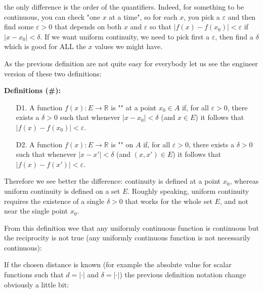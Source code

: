 	the only difference is the order of the quantifiers. Indeed, for something to be continuous, you can check "one $x$ at a time", so for each $x$, you pick a $\varepsilon$ and then find some $\varepsilon>0$ that depends on both $x$ and $\varepsilon$ so that $|f(x)-f(x_0)|<\varepsilon$ if $|x-x_0|<\delta$. If we want uniform continuity, we need to pick first a $\varepsilon$, then find a $\delta$ which is good for ALL the $x$ values we might have.
	
	As the previous definition are not quite easy for everybody let us see the engineer version of these two definitions:
	
	\pagebreak
	\textbf{Definitions (\#\mydef):}
	\begin{enumerate}
		\item[D1.] A function $f(x):E \rightarrow \mathbb{R}$ is "" at a point $x_0\in A$ if, for all $\varepsilon>0$, there exists a $\delta>0$ such that whenever $|x-x_0|<\delta$ (and $x\in E$) it follows that $|f(x)-f(x_0)|<\varepsilon$.
		
		\item[D2.] A function $f(x):E \rightarrow \mathbb{R}$ is "" on $A$ if, for all $\varepsilon>0$, there exists a $\delta>0$ such that whenever $|x-x'|<\delta$ (and $(x,x')\in E$) it follows that $|f(x)-f(x')|<\varepsilon$.
	\end{enumerate}
	Therefore we see better the difference: continuity is defined at a point $x_0$, whereas uniform continuity is defined on a set $E$. Roughly speaking, uniform continuity requires the existence of a single $\delta>0$ that works for the whole set $E$, and not near the single point $x_0$.
	
	From this definition wee that any uniformly continuous function is continuous but the reciprocity is not true (any uniformly continuous function is not necessarily continuous):
	
	If the chosen distance is known (for example the absolute value for scalar functions such that $d=|\cdot|$ and $\delta=|\cdot|$) the previous definition notation change obviously a little bit:
	
